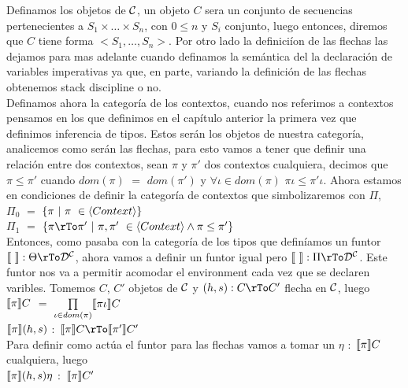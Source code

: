 Definamos los objetos de $\mathcal{C}$, un objeto $C$ sera un conjunto de secuencias 
pertenecientes a $S_1 \times \ldots \times S_n$, con $0 \leq n$ y $S_i$ conjunto, 
luego entonces, diremos que $C$ tiene forma $<S_1,\ldots,S_n>$. Por otro lado
la definici\'ion de las flechas las dejamos para mas adelante cuando definamos 
la sem\'antica del la declaraci\'on de variables imperativas ya que, en parte,
variando la definici\'on de las flechas obtenemos stack discipline o no.\\

Definamos ahora la categor\'ia de los contextos, cuando nos referimos a contextos
pensamos en los que definimos en el cap\'itulo anterior la primera vez que definimos
inferencia de tipos. Estos ser\'an los objetos de nuestra categor\'ia, analicemos
como ser\'an las flechas, para esto vamos a tener que definir una relaci\'on
entre dos contextos, sean $\pi$ y $\pi'$ dos contextos cualquiera, decimos que 
$\pi \leq \pi'$ cuando $dom(\pi)$ $=$ $dom(\pi')$ y $\forall \iota \in dom(\pi)$ 
$\pi \iota \leq \pi' \iota$. Ahora estamos en condiciones de definir la 
categor\'ia de contextos que simbolizaremos con $\Pi$,\\

\noindent 
$\Pi_0$ $=$ $\{\pi \ | \ \pi \ \in \langle Context \rangle \}$\\
$\Pi_1$ $=$ $\{\pi \rTo \pi' \ | \ \pi,\pi' \ \in \lrangles{Context} \wedge \pi \leq \pi' \}$\\

Entonces, como pasaba con la categor\'ia de los tipos que defin\'iamos un funtor
$\semBrcks{ \ } : \Theta \rTo \DC$, ahora vamos a definir un funtor igual pero
$\semBrcks{ \ } : \Pi \rTo \DC$. Este funtor nos va a permitir acomodar el environment
cada vez que se declaren varibles. Tomemos $C$, $C'$ objetos de $\mathcal{C}$ y $(h,s): C \rTo C'$
flecha en $\mathcal{C}$, luego\\

\noindent
$\llbracket \pi \rrbracket C$ $=$ $\prod\limits_{\iota \in dom(\pi)} \llbracket \pi \iota \rrbracket C$\\
$\llbracket \pi \rrbracket(h,s)$ $:$ $\semBrcks{\pi}C \rTo \semBrcks{\pi'}C'$\\

\noindent
Para definir como act\'ua el funtor para las flechas vamos a tomar un $\eta$ $:$ $\llbracket \pi \rrbracket C$
cualquiera, luego\\

\noindent
$\llbracket \pi \rrbracket(h,s)\eta$ $:$ $\llbracket \pi \rrbracket C'$\\

